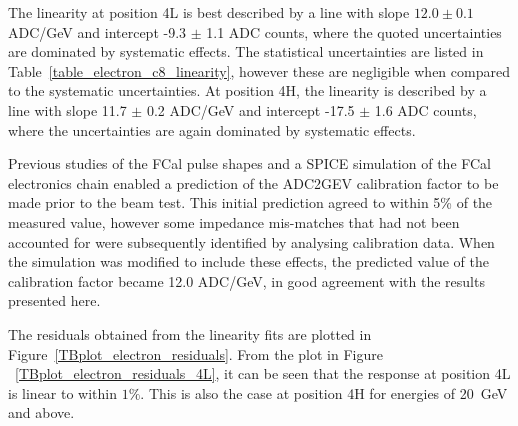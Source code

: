 


The linearity at position 4L is best described by a line with slope $12.0 \pm 0.1$  ADC/GeV and intercept -9.3 $\pm$ 1.1 ADC counts, where the quoted uncertainties are dominated by  systematic effects. The statistical uncertainties are listed in Table~\ref{table_electron_c8_linearity}, however these are negligible when compared to the systematic uncertainties. At position 4H, the linearity is described by a line with slope 11.7 $\pm$ 0.2 ADC/GeV and intercept -17.5 $\pm$ 1.6 ADC counts, where the uncertainties are again dominated by systematic effects.

Previous studies of the FCal pulse shapes \cite{Rutherfoord:968060,Rutherfoord:970622} and a SPICE simulation of the FCal electronics chain enabled a prediction of the ADC2GEV calibration factor to be made prior to the beam test. This initial prediction agreed to within 5\% of the measured value, however some impedance mis-matches that had not been accounted for were subsequently identified by analysing calibration data\cite{FCal_paper}. When the simulation was modified to include these effects, the predicted value of the calibration factor became 12.0 ADC/GeV, in good agreement with the results presented here.


% 
% 
% 
% 
% 
% 
% 



The residuals obtained from the linearity fits are plotted in Figure~\ref{TBplot_electron_residuals}. From the plot in Figure ~\ref{TBplot_electron_residuals_4L}, it can be seen that the response at position 4L is linear to within $1\%$. This is also the case at position 4H for energies of 20~GeV and above.

%



